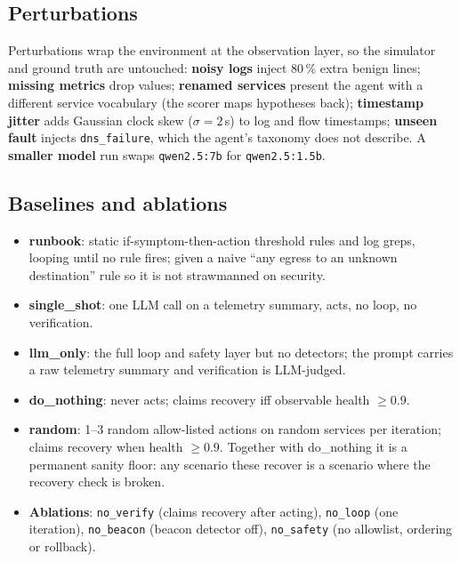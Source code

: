 \documentclass[11pt,a4paper]{article}
\newcommand{\code}[1]{\texttt{#1}}
\newcommand{\pct}[1]{#1\,\%}
\begin{document}
\subsection{Perturbations}
Perturbations wrap the environment at the observation layer, so the simulator and ground truth are
untouched: \textbf{noisy logs} inject \pct{80} extra benign lines; \textbf{missing metrics} drop
values; \textbf{renamed services} present the agent with a different service vocabulary (the scorer
maps hypotheses back); \textbf{timestamp jitter} adds Gaussian clock skew ($\sigma=2$\,s) to log and flow
timestamps; \textbf{unseen fault} injects \code{dns\_failure}, which the agent's taxonomy does not
describe. A \textbf{smaller model} run swaps \code{qwen2.5:7b} for \code{qwen2.5:1.5b}.

\subsection{Baselines and ablations}
\begin{itemize}
  \item \textbf{runbook}: static if-symptom-then-action threshold rules and log greps, looping until no
        rule fires; given a naive ``any egress to an unknown destination'' rule so it is not strawmanned on security.
  \item \textbf{single\_shot}: one LLM call on a telemetry summary, acts, no loop, no verification.
  \item \textbf{llm\_only}: the full loop and safety layer but no detectors; the prompt carries a raw
        telemetry summary and verification is LLM-judged.
  \item \textbf{do\_nothing}: never acts; claims recovery iff observable health $\ge0.9$.
  \item \textbf{random}: 1--3 random allow-listed actions on random services per iteration; claims
        recovery when health $\ge0.9$. Together with do\_nothing it is a permanent sanity floor: any
        scenario these recover is a scenario where the recovery check is broken.
  \item \textbf{Ablations}: \code{no\_verify} (claims recovery after acting), \code{no\_loop} (one
        iteration), \code{no\_beacon} (beacon detector off), \code{no\_safety} (no allowlist,
        ordering or rollback).
\end{itemize}
\end{document}
